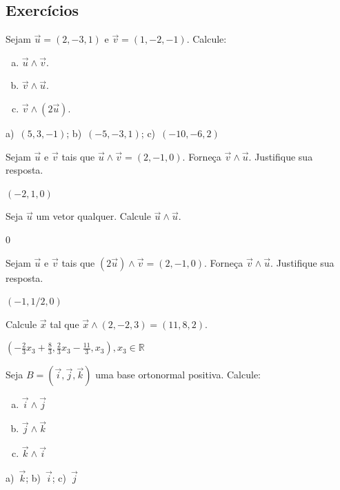 \subsection{Exercícios}

\begin{exer}
  Sejam $\vec{u}=(2,-3,1)$ e $\vec{v}=(1,-2,-1)$. Calcule:
  \begin{enumerate}[a)]
  \item $\vec{u}\land\vec{v}$.
  \item $\vec{v}\land\vec{u}$.
  \item $\vec{v}\land(2\vec{u})$.
  \end{enumerate}
\end{exer}
\begin{resp}
  a)~$(5,3,-1)$; b)~$(-5,-3,1)$; c)~$(-10,-6,2)$
\end{resp}

\begin{exer}
  Sejam $\vec{u}$ e $\vec{v}$ tais que $\vec{u}\land\vec{v}=(2,-1,0)$. Forneça $\vec{v}\land\vec{u}$. Justifique sua resposta.
\end{exer}
\begin{resp}
  $(-2,1,0)$
\end{resp}

\begin{exer}
  Seja $\vec{u}$ um vetor qualquer. Calcule $\vec{u}\land\vec{u}$.
\end{exer}
\begin{resp}
  $0$
\end{resp}

\begin{exer}
  Sejam $\vec{u}$ e $\vec{v}$ tais que $(2\vec{u})\land\vec{v}=(2,-1,0)$. Forneça $\vec{v}\land\vec{u}$. Justifique sua resposta.
\end{exer}
\begin{resp}
  $(-1,1/2,0)$
\end{resp}

\begin{exer}
  Calcule $\vec{x}$ tal que $\vec{x}\land (2,-2,3)=(11,8,2)$.
\end{exer}
\begin{resp}
  $\left(-\frac{2}{3}x_3+\frac{8}{3},\frac{2}{3}x_3-\frac{11}{3},x_3\right), x_3\in\mathbb{R}$
\end{resp}

\begin{exer}
  Seja $B=(\vec{i},\vec{j},\vec{k})$ uma base ortonormal positiva. Calcule:
  \begin{enumerate}[a)]
  \item $\vec{i}\land\vec{j}$
  \item $\vec{j}\land\vec{k}$
  \item $\vec{k}\land\vec{i}$
  \end{enumerate}
\end{exer}
\begin{resp}
  a)~$\vec{k}$; b)~$\vec{i}$; c)~$\vec{j}$
\end{resp}

